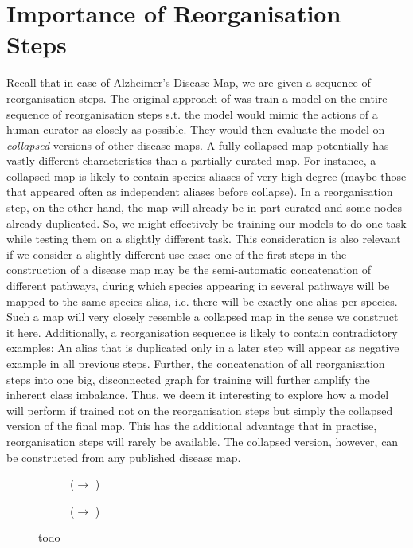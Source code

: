 \documentclass[
	fontsize=10pt, %
	twoside=false, %
	secnumdepth=1, %
]{kaobook}
\begin{document}
\section{Importance of Reorganisation Steps}
Recall that in case of Alzheimer's Disease Map, we are given a sequence of
reorganisation steps. The original approach of \nielsen was train a model on the
entire sequence of reorganisation steps s.t. the model would mimic the actions
of a human curator as closely as possible. They would then evaluate the model on
\textit{collapsed} versions of other disease maps.
%
A fully collapsed map potentially has vastly different characteristics than a
partially curated map. For instance, a collapsed map is likely to contain
species aliases of very high degree (maybe those that appeared often as
independent aliases before collapse). In a reorganisation step, on the other
hand, the map will already be in part curated and some nodes already duplicated.
%
So, we might effectively be training our models to do one task while testing
them on a slightly different task.
%
This consideration is also relevant if we consider a slightly different
use-case: one of the first steps in the construction of a disease map may be the
semi-automatic concatenation of different pathways, during which species
appearing in several pathways will be mapped to the same species alias, i.e.
there will be exactly one alias per species. Such a map will very closely
resemble a collapsed map in the sense we construct it here.
%
Additionally, a reorganisation sequence is likely to contain contradictory
examples: An alias that is duplicated only in a later step will appear as
negative example in all previous steps. Further, the concatenation of all
reorganisation steps into one big, disconnected graph for training
will further amplify the inherent class imbalance.
%
Thus, we deem it interesting to explore how a model will perform if trained not
on the reorganisation steps but simply the collapsed version of the final map.
%
This has the additional advantage that in practise, reorganisation steps will
rarely be available. The collapsed version, however, can be constructed from any
published disease map.

\begin{figure}[h]
  \centering
  \begin{subfigure}[h]{0.48\linewidth}
    \caption{(\ADLast $\rightarrow$ \PDMap)}
  \end{subfigure}
  \begin{subfigure}[h]{0.48\linewidth}
    \caption{(\ADLast $\rightarrow$ \ReconMap)}
  \end{subfigure}
  \caption{todo}
  \label{fig:importance-reorganisation-steps}
\end{figure}
\end{document}
